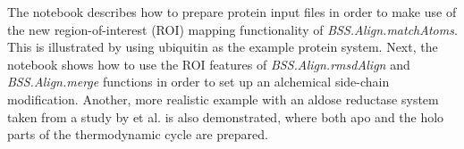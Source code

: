 The notebook describes how to prepare protein input files in order to make use of the new region-of-interest (ROI) mapping functionality of \textit{BSS.Align.matchAtoms}. This is illustrated by using ubiquitin as the example protein system. Next, the notebook shows how to use the ROI features of \textit{BSS.Align.rmsdAlign} and \textit{BSS.Align.merge} functions in order to set up an alchemical side-chain modification. Another, more realistic example with an aldose reductase system taken from a study by \citeauthor{doi:10.1021/acscentsci.8b00717} et al. is also demonstrated, where both apo and the holo parts of the thermodynamic cycle are prepared.